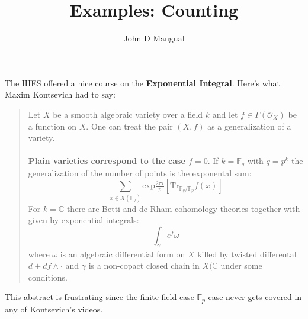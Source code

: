 \documentclass[12pt]{article}
\title{\textbf{ Examples:  Counting }}
\author{John D Mangual}
\date{}
\begin{document}
\selectfont \fontsize{25}{30}\selectfont

\maketitle

\noindent The IHES offered a nice course on the \textbf{Exponential Integral}.  Here's what Maxim Kontsevich had to say:

\selectfont \fontsize{15}{20}\selectfont
\begin{quotation}
	Let $X$ be a smooth algebraic variety over a field $k$ and let $f \in \Gamma(\mathcal{O}_X)$ be a function on $X$.  One can treat the pair $(X,f)$ as a generalization of a variety. \\ \\
\textbf{Plain varieties correspond to the case $f = 0$}.  If $k = \mathbb{F}_q$ with $q = p^k$ the generalization of the number of points is the exponental sum:
$$ \sum_{x \in X(\mathbb{F}_q)} 
\mathrm{exp} \tfrac{2\pi i }{p}\left[ \text{Tr}_{\mathbb{F}_q/\mathbb{F}_p} f(x) \right]$$
For $k = \mathbb{C}$ there are Betti and de Rham cohomology theories together with {} given by exponential integrals:
$$ \int_\gamma e^f \omega $$ where $\omega$ is an algebraic differential form on $X$ killed by twisted differental $d + df \wedge \cdot $  and $\gamma$ is a non-copact closed chain in $X(\mathbb{C}$ under some conditions.
\end{quotation}
\selectfont \fontsize{25}{30}\selectfont
This abstract is frustrating since the finite field case $\mathbb{F}_p$ case never gets covered in any of Kontsevich's videos.  \newpage
\end{document}

